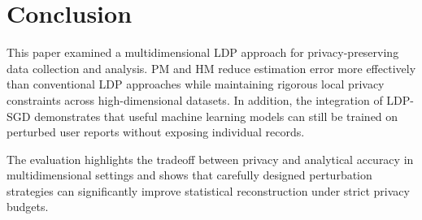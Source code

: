 \documentclass[sigconf]{acmart}
\begin{document}
\section{Conclusion}

This paper examined a multidimensional LDP approach for privacy-preserving data collection and analysis. PM and HM reduce estimation error more effectively than conventional LDP approaches while maintaining rigorous local privacy constraints across high-dimensional datasets. In addition, the integration of LDP-SGD demonstrates that useful machine learning models can still be trained on perturbed user reports without exposing individual records.

The evaluation highlights the tradeoff between privacy and analytical accuracy in multidimensional settings and shows that carefully designed perturbation strategies can significantly improve statistical reconstruction under strict privacy budgets.




\end{document}
